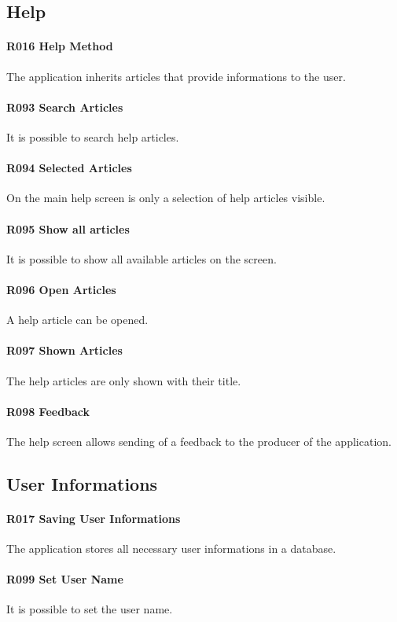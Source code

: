 \subsection{Help}
\paragraph{R016 Help Method}
The application inherits articles that provide informations to the user.
\paragraph{R093 Search Articles}
It is possible to search help articles.
\paragraph{R094 Selected Articles}
On the main help screen is only a selection of help articles visible.
\paragraph{R095 Show all articles}
It is possible to show all available articles on the screen.
\paragraph{R096 Open Articles}
A help article can be opened.
\paragraph{R097 Shown Articles}
The help articles are only shown with their title.
\paragraph{R098 Feedback}
The help screen allows sending of a feedback to the producer of the application.

\subsection{User Informations}
\paragraph{R017 Saving User Informations}
The application stores all necessary user informations in a database.
\paragraph{R099 Set User Name}
It is possible to set the user name.
